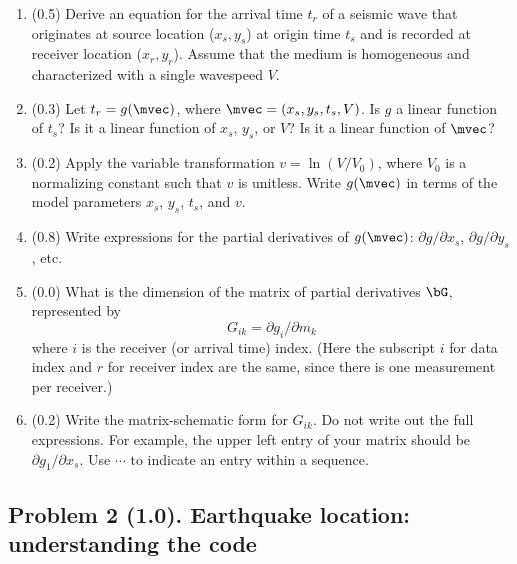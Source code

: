\documentclass[11pt,titlepage,fleqn]{article}
\begin{document}
\begin{enumerate}
\item (0.5) Derive an equation for the arrival time $t_r$ of a seismic wave that originates at source location ($x_s, y_s$) at origin time $t_s$ and is recorded at receiver location ($x_r, y_r$). Assume that the medium is homogeneous and characterized with a single wavespeed $V$.

\item (0.3) Let $t_r = g(\mvec)$, where $\mvec = (x_s,y_s,t_s,V)$.
Is $g$ a linear function of $t_s$? Is it a linear function of $x_s$, $y_s$, or $V$?
Is it a linear function of $\mvec$?

\item (0.2) Apply the variable transformation $v = \ln(V/V_0)$, where $V_0$ is a normalizing constant such that $v$ is unitless. Write $g(\mvec)$ in terms of the model parameters $x_s$, $y_s$, $t_s$, and $v$.

\item (0.8) Write expressions for the partial derivatives of $g(\mvec)$: $\partial g/ \partial x_s$, $\partial g/ \partial y_s$, etc.

\item (0.0) What is the dimension of the matrix of partial derivatives $\bG$, represented by
%
\begin{equation}
G_{ik} = \partial g_i/ \partial m_k
\end{equation}
%
where $i$ is the receiver (or arrival time) index. (Here the subscript $i$ for data index and $r$ for receiver index are the same, since there is one measurement per receiver.)

\item (0.2) Write the matrix-schematic form for $G_{ik}$. Do not write out the full expressions.
For example, the upper left entry of your matrix should be $\partial g_1/\partial x_s$.
Use $\cdots$ to indicate an entry within a sequence.

\end{enumerate}


\subsection*{Problem 2 (1.0). Earthquake location: understanding the code}
\end{document}
